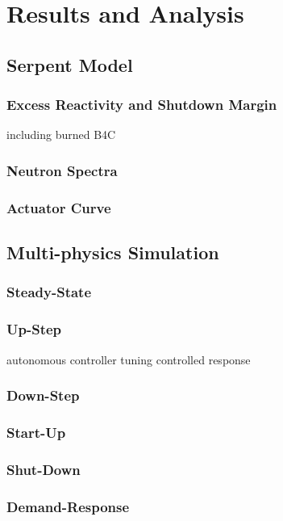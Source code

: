 \chapter{Results and Analysis}
\label{Chapter:Results}

\section{Serpent Model}

\subsection{Excess Reactivity and Shutdown Margin}
including burned B4C

\subsection{Neutron Spectra}

\subsection{Actuator Curve}\label{sec:actuator}

\section{Multi-physics Simulation}

\subsection{Steady-State}

\subsection{Up-Step}
autonomous
controller tuning
controlled response


\subsection{Down-Step}

\subsection{Start-Up}

\subsection{Shut-Down}

\subsection{Demand-Response}